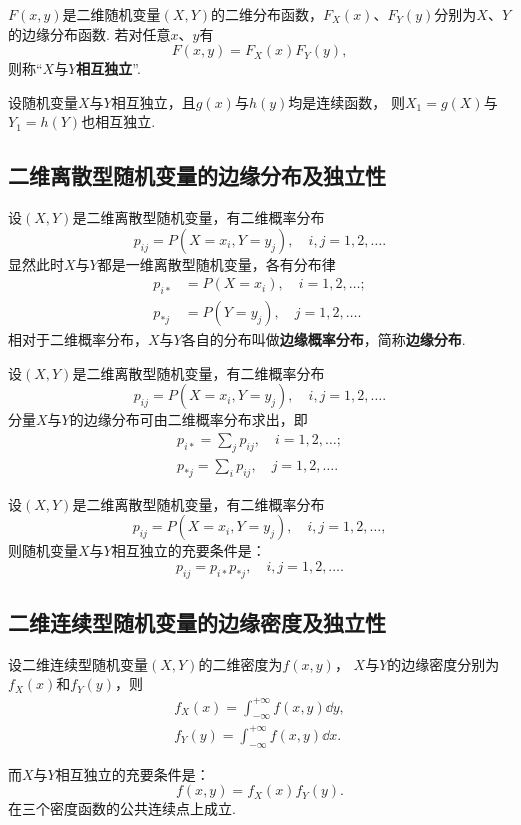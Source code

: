 \begin{definition}
\(F(x,y)\)是二维随机变量\((X,Y)\)的二维分布函数，\(F_X(x)\)、\(F_Y(y)\)分别为\(X\)、\(Y\)的边缘分布函数.
若对任意\(x\)、\(y\)有\[
F(x,y) = F_X(x) F_Y(y),
\]则称“\(X\)与\(Y\)\textbf{相互独立}”.
\end{definition}

\begin{theorem}
设随机变量\(X\)与\(Y\)相互独立，且\(g(x)\)与\(h(y)\)均是连续函数，%
则\(X_1 = g(X)\)与\(Y_1 = h(Y)\)也相互独立.
\end{theorem}

\subsection{二维离散型随机变量的边缘分布及独立性}
\begin{definition}
设\((X,Y)\)是二维离散型随机变量，有二维概率分布\[
p_{ij} = P(X=x_i,Y=y_j), \quad i,j=1,2,\dotsc.
\]显然此时\(X\)与\(Y\)都是一维离散型随机变量，各有分布律
\begin{align*}
p_{i*} &= P(X=x_i), \quad i=1,2,\dotsc; \\
p_{*j} &= P(Y=y_j), \quad j=1,2,\dotsc.
\end{align*}
相对于二维概率分布，\(X\)与\(Y\)各自的分布叫做\textbf{边缘概率分布}，简称\textbf{边缘分布}.
\end{definition}

\begin{theorem}
设\((X,Y)\)是二维离散型随机变量，有二维概率分布\[
p_{ij} = P(X=x_i,Y=y_j), \quad i,j=1,2,\dotsc.
\]分量\(X\)与\(Y\)的边缘分布可由二维概率分布求出，即
\begin{align*}
p_{i*} = \sum_{j}{p_{ij}}, \quad i=1,2,\dotsc; \\
p_{*j} = \sum_{i}{p_{ij}}, \quad j=1,2,\dotsc.
\end{align*}
\end{theorem}

\begin{theorem}
设\((X,Y)\)是二维离散型随机变量，有二维概率分布\[
p_{ij} = P(X=x_i,Y=y_j), \quad i,j=1,2,\dotsc,
\]则随机变量\(X\)与\(Y\)相互独立的充要条件是：\[
p_{ij} = p_{i*} p_{*j}, \quad i,j=1,2,\dotsc.
\]
\end{theorem}

\subsection{二维连续型随机变量的边缘密度及独立性}
\begin{theorem}
设二维连续型随机变量\((X,Y)\)的二维密度为\(f(x,y)\)，%
\(X\)与\(Y\)的边缘密度分别为\(f_X(x)\)和\(f_Y(y)\)，则
\begin{align*}
f_X(x) = \int_{-\infty}^{+\infty} f(x,y) \dd{y}, \\
f_Y(y) = \int_{-\infty}^{+\infty} f(x,y) \dd{x}.
\end{align*}

而\(X\)与\(Y\)相互独立的充要条件是：\[
f(x,y) = f_X(x) f_Y(y).
\]在三个密度函数的公共连续点上成立.
\end{theorem}

